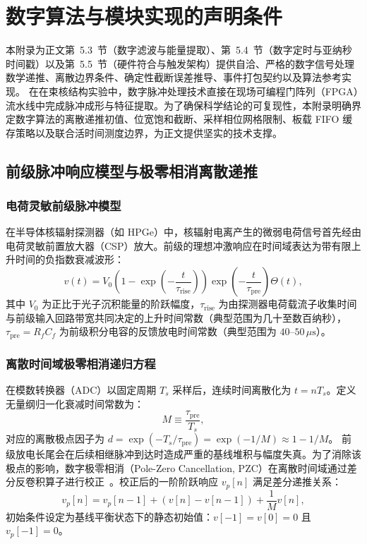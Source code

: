 \chapter{数字算法与模块实现的声明条件}\label{app:digital-algorithms}

本附录为正文第~5.3~节（数字滤波与能量提取）、第~5.4~节（数字定时与亚纳秒时间戳）以及第~5.5~节（硬件符合与触发架构）提供自洽、严格的数字信号处理数学递推、离散边界条件、确定性截断误差推导、事件打包契约以及算法参考实现。
在在束核结构实验中，数字脉冲处理技术直接在现场可编程门阵列（FPGA）流水线中完成脉冲成形与特征提取。为了确保科学结论的可复现性，本附录明确界定数字算法的离散递推初值、位宽饱和截断、采样相位网格限制、板载 FIFO 缓存策略以及联合活时间测度边界，为正文提供坚实的技术支撑。

\section{前级脉冲响应模型与极零相消离散递推}\label{sec:appE-pzc}

\subsection{电荷灵敏前级脉冲模型}

在半导体核辐射探测器（如 HPGe）中，核辐射电离产生的微弱电荷信号首先经由电荷灵敏前置放大器（CSP）放大。前级的理想冲激响应在时间域表达为带有限上升时间的负指数衰减波形：
\begin{equation}\label{eq:appE-csp-model}
v(t) = V_0 \left( 1 - \exp\left( -\frac{t}{\tau_{\mathrm{rise}}} \right) \right) \exp\left( -\frac{t}{\tau_{\mathrm{pre}}} \right) \Theta(t),
\end{equation}
其中 $V_0$ 为正比于光子沉积能量的阶跃幅度，$\tau_{\mathrm{rise}}$ 为由探测器电荷载流子收集时间与前级输入回路带宽共同决定的上升时间常数（典型范围为几十至数百纳秒），$\tau_{\mathrm{pre}} = R_f C_f$ 为前级积分电容的反馈放电时间常数（典型范围为 $40$–$50\,\mu\text{s}$）。

\subsection{离散时间域极零相消递归方程}

在模数转换器（ADC）以固定周期 $T_s$ 采样后，连续时间离散化为 $t = n T_s$。定义无量纲归一化衰减时间常数为：
\begin{equation}\label{eq:appE-m-def}
M \equiv \frac{\tau_{\mathrm{pre}}}{T_s},
\end{equation}
对应的离散极点因子为 $d = \exp(-T_s/\tau_{\mathrm{pre}}) = \exp(-1/M) \approx 1 - 1/M$。
前级放电长尾会在后续相继脉冲到达时造成严重的基线堆积与幅度失真。为了消除该极点的影响，数字极零相消（Pole-Zero Cancellation, PZC）在离散时间域通过差分反卷积算子进行校正~\cite{wu-hongyi-2020-general-purpose-digital-daq-thesis, wu-2021-general-purpose-digital-daq-waveform-analysis}。校正后的一阶阶跃响应 $v_p[n]$ 满足差分递推关系：
\begin{equation}\label{eq:appE-pzc-recurrence}
v_p[n] = v_p[n-1] + \left( v[n] - v[n-1] \right) + \frac{1}{M} v[n],
\end{equation}
初始条件设定为基线平衡状态下的静态初始值：$v[-1] = v[0] = 0$ 且 $v_p[-1] = 0$。

